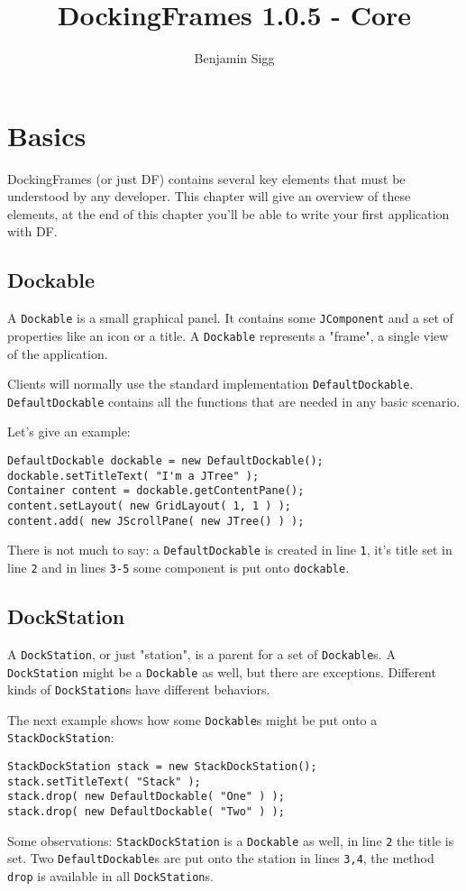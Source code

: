 \documentclass[a4paper,10pt]{article}
\title{DockingFrames 1.0.5 - Core}
\author{Benjamin Sigg}
\newcommand{\src}[1]{\lstinline[basicstyle=\normalsize\ttfamily,keywordstyle=\normalsize\ttfamily,identifierstyle=\normalsize\ttfamily]|#1|}
\begin{document}
\maketitle
\tableofcontents
\newpage

\section{Basics}
DockingFrames (or just DF) contains several key elements that must be understood by any developer. This chapter will give an overview of these elements, at the end of this chapter you'll be able to write your first application with DF.

\subsection{Dockable}
A \src{Dockable} is a small graphical panel. It contains some \src{JComponent} and a set of properties like an icon or a title. A \src{Dockable} represents a "frame", a single view of the application.

Clients will normally use the standard implementation \src{DefaultDockable}. \src{DefaultDockable} contains all the functions that are needed in any basic scenario.

Let's give an example:
\begin{lstlisting}
DefaultDockable dockable = new DefaultDockable();
dockable.setTitleText( "I'm a JTree" );
Container content = dockable.getContentPane();
content.setLayout( new GridLayout( 1, 1 ) );
content.add( new JScrollPane( new JTree() ) );
\end{lstlisting}
There is not much to say: a \src{DefaultDockable} is created in line \src{1}, it's title set in line \src{2} and in lines \src{3-5} some component is put onto \src{dockable}.

\subsection{DockStation}
A \src{DockStation}, or just "station", is a parent for a set of \src{Dockable}s. A \src{DockStation} might be a \src{Dockable} as well, but there are exceptions. Different kinds of \src{DockStation}s have different behaviors.

The next example shows how some \src{Dockable}s might be put onto a \\\src{StackDockStation}:
\begin{lstlisting}
StackDockStation stack = new StackDockStation();
stack.setTitleText( "Stack" );
stack.drop( new DefaultDockable( "One" ) );
stack.drop( new DefaultDockable( "Two" ) );
\end{lstlisting}
Some observations: \src{StackDockStation} is a \src{Dockable} as well, in line \src{2} the title is set. Two \src{DefaultDockable}s are put onto the station in lines \src{3,4}, the method \src{drop} is available in all \src{DockStation}s.
\end{document}
